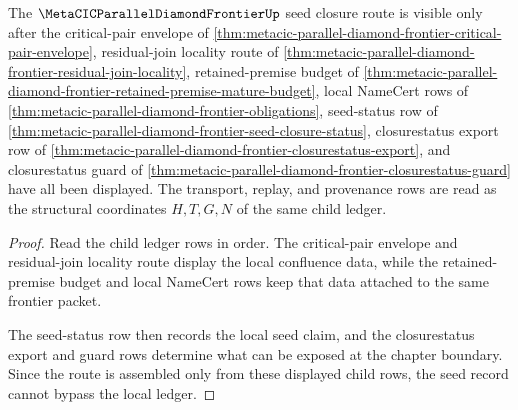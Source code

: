 \begin{theorem}
\label{thm:metacic-parallel-diamond-frontier-seed-closure-route}
The $\MetaCICParallelDiamondFrontierUp$ seed closure route is visible only after the critical-pair envelope of \autoref{thm:metacic-parallel-diamond-frontier-critical-pair-envelope}, residual-join locality route of \autoref{thm:metacic-parallel-diamond-frontier-residual-join-locality}, retained-premise budget of \autoref{thm:metacic-parallel-diamond-frontier-retained-premise-mature-budget}, local NameCert rows of \autoref{thm:metacic-parallel-diamond-frontier-obligations}, seed-status row of \autoref{thm:metacic-parallel-diamond-frontier-seed-closure-status}, closurestatus export row of \autoref{thm:metacic-parallel-diamond-frontier-closurestatus-export}, and closurestatus guard of \autoref{thm:metacic-parallel-diamond-frontier-closurestatus-guard} have all been displayed. The transport, replay, and provenance rows are read as the structural coordinates $H,T,G,N$ of the same child ledger.
\end{theorem}
\begin{proof}
Read the child ledger rows in order. The critical-pair envelope and residual-join locality route display the local confluence data, while the retained-premise budget and local NameCert rows keep that data attached to the same frontier packet.

The seed-status row then records the local seed claim, and the closurestatus export and guard rows determine what can be exposed at the chapter boundary. Since the route is assembled only from these displayed child rows, the seed record cannot bypass the local ledger.
\end{proof}

